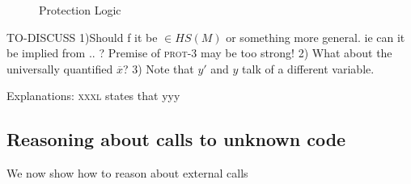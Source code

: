 \begin{figure}[hbt]
\footnotesize
{}
\caption{Protection Logic}
\label{f:protection}
\end{figure}

TO-DISCUSS 1)Should f it be $\in HS(M)$ or something more general. ie can it be implied from .. ? Premise of  \textsc{prot-3} may be too strong!
2) What about the universally quantified $\overline x$? 3)  Note that $y'$ and $y$ talk of a different variable.
 

Explanations: \textsc{xxxl} states that   yyy
  
 
\subsection{Reasoning about calls to unknown code}

We now show how to reason about external calls

